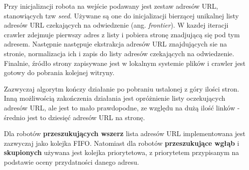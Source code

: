 Przy inicjalizacji robota na wejście podawany jest zestaw adresów URL, stanowiących tzw \emph{seed}. Używane są one do inicjalizacji bierzącej unikalnej listy adresów URL czekających na odwiedzenie (ang. \emph{frontier}). W kazdej iteracji crawler zdejmuje pierwszy adres z listy i pobiera stronę znadjującą 
się pod tym adresem. Następnie następuje ekstrakcja adresów URL znajdujących sie na stronie, normalizacja ich i zapis do listy adresów czekających na odwiedzenie. Finalnie, źródło strony zapisywane jest w lokalnym systemie plików i crawler jest gotowy do pobrania kolejnej witryny.

Zazwyczaj algorytm kończy działanie po pobraniu ustalonej z góry ilości stron. Inną możliwością zakończenia działania jest opróżnienie listy oczekujących adresów URL, ale jest to mało prawdopodne, ze względu na dużą ilość linków - średnio jest to dziesięć adresów URL na stronę\cite[s.312]{webMining}.

Dla robotów \textbf{przeszukujących wszerz} lista adresów URL implementowana jest zazwyczaj jako kolejka FIFO. Natomiast dla  robotów \textbf{przeszukujące wgłąb}
i \textbf{skupionych} używana jest kolejka priorytetowa, z priorytetem przypisanym na podstawie oceny przydatności danego adresu.


